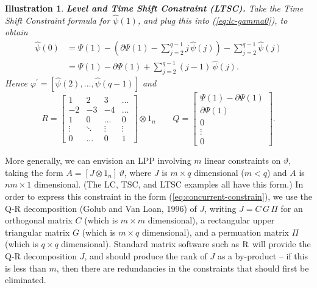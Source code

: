 \documentclass[a4paper]{book}
\newtheorem{Illustration}{Illustration}
\begin{document}
 
\begin{Illustration}  {\bf Level and Time Shift Constraint (LTSC).}  \rm
\label{ill:ltsc}
   Take the Time Shift Constraint formula for $\widehat{\psi} (1)$,
 and plug this into (\ref{eq:lc-gamma0}), to obtain
\begin{align*}
 \widehat{\psi} (0)  & = \Psi (1) - \left( \partial {\Psi} (1)  -  \sum_{j=2}^{q-1} j  \, \widehat{\psi} (j) \right) -  \sum_{j=2}^{q-1} 
 \widehat{\psi} (j)  \\
	& = \Psi (1) -  \partial {\Psi} (1)  +  \sum_{j=2}^{q-1} (j-1)  \, \widehat{\psi} (j).
\end{align*}
 Hence  $ \varphi^{\prime}  = [  \widehat{\psi} (2), \ldots, \widehat{\psi} (q-1)  ] $ and
\[
	R  = \left[ \begin{array}{cccc} 1 & 2  &  3  &   \ldots    \\  -2  & -3  &  -4  & \ldots  \\
		 1  & 0 & \ldots & 0 \\ 
		\vdots & \ddots & \vdots & \vdots \\ 0 & \ldots & 0 & 1 \end{array} \right]  \otimes 1_n \qquad
	Q = \left[ \begin{array}{c} \Psi (1) - \partial {\Psi} (1)  \\  \partial {\Psi} (1) \\ 0 \\ \vdots \\ 0 \end{array} \right].
\]
\end{Illustration}



 More generally, we can envision an LPP involving $m$ linear constraints on 
  $\vartheta$, taking the form
 $   A = [ J \otimes 1_n ] \, \vartheta$, where $J$ is $m \times q$ 
 dimensional ($m < q$) and $A$ is $n m \times 1$ dimensional.
 (The LC, TSC, and LTSC examples all have this form.)  In order to express 
 this constraint in the form 
 (\ref{eq:concurrent-constrain}), we use the Q-R decomposition 
 (Golub and Van Loan, 1996) of $J$, writing
 $J = C \, G \, \Pi$ for an orthogonal matrix $C$ (which is $m \times m$ dimensional),
 a rectangular upper triangular matrix $G$
 (which is $m \times q$ dimensional), and a permuation matrix $\Pi$ 
 (which is $q \times q$ dimensional).  
 Standard matrix software such as $\textsc{R}$ will provide the Q-R decomposition $J$,
 and should produce the rank of $J$ as  a by-product --
 if this is less than $m$, then there are redundancies in the 
 constraints that should first be eliminated. 
 
\end{document}
